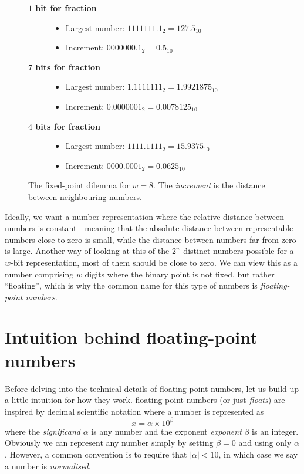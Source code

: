 \begin{figure}
  \begin{framed}
  \centering
    \begin{description}
  \item[\textbf{$1$ bit for fraction}]\hfill
    \begin{itemize}
    \item Largest number: $1111111.1_{2} = 127.5_{10}$
    \item Increment: $0000000.1_{2}=0.5_{10}$
    \end{itemize}
  \item[\textbf{$7$ bits for fraction}]\hfill
    \begin{itemize}
    \item Largest number: $1.1111111_{2} = 1.9921875_{10}$
    \item Increment: $0.0000001_{2}=0.0078125_{10}$
    \end{itemize}
  \item[\textbf{$4$ bits for fraction}]\hfill
    \begin{itemize}
    \item Largest number: $1111.1111_{2} = 15.9375_{10}$
    \item Increment: $0000.0001_{2}=0.0625_{10}$
    \end{itemize}
  \end{description}
  \end{framed}
  \caption{The fixed-point dilemma for $w=8$.  The \emph{increment} is the
    distance between neighbouring numbers.}
  \label{fig:fixedpoint}
\end{figure}

Ideally, we want a number representation where the relative distance
between numbers is constant---meaning that the absolute distance
between representable numbers close to zero is small, while the
distance between numbers far from zero is large.  Another way of
looking at this of the $2^{w}$ distinct numbers possible for a $w$-bit
representation, most of them should be close to zero.  We can view
this as a number comprising $w$ digits where the binary point is not
fixed, but rather ``floating'', which is why the common name for this
type of numbers is \emph{floating-point numbers}.

\section{Intuition behind floating-point numbers}

Before delving into the technical details of floating-point numbers,
let us build up a little intuition for how they work.  floating-point
numbers (or just \emph{floats}) are inspired by decimal scientific
notation where a number is represented as
\begin{equation}
  x = \alpha \times 10^{\beta}
\end{equation}
where the \emph{significand} $\alpha$ is any number and the exponent
\emph{exponent} $\beta$ is an integer.  Obviously we can represent any
number simply by setting $\beta=0$ and using only $\alpha$.  However,
a common convention is to require that $|\alpha|<10$, in which case we
say a number is \emph{normalised}.

